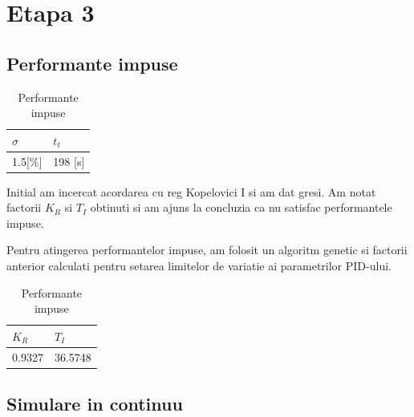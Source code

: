 \documentclass[12pt,english]{article}
\begin{document}
\section {Etapa 3}

\subsection {Performante impuse}

\begin{table}[H]
  \centering
  \begin{tabular}{|l|l|}
    \hline
    $\sigma$ & $t_t$ \\
    \hline
    1.5[\%] & 198 [s] \\
    \hline
  \end{tabular}
  \caption{Performante impuse}
\end{table}

Initial am incercat acordarea cu reg Kopelovici I si am dat gresi. Am notat factorii $K_R$ si $T_I$ obtinuti si am ajuns la concluzia ca nu satisfac performantele impuse.

Pentru atingerea performantelor impuse, am folosit un algoritm genetic si factorii anterior calculati pentru setarea limitelor de variatie ai parametrilor PID-ului.

\begin{table}[H]
  \centering
  \begin{tabular}{|l|l|}
    \hline
    $K_R$ & $T_I$ \\
    \hline
    0.9327 & 36.5748 \\
    \hline
  \end{tabular}
  \caption{Performante impuse}
\end{table}

\subsection {Simulare in continuu}

\begin{figure}[H]
  \centering
\end{figure}
\end{document}

